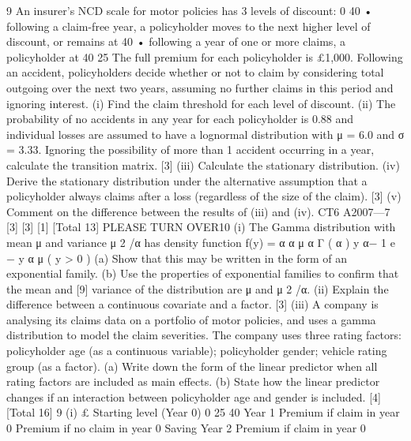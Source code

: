 \documentclass[a4paper,12pt]{article}
\begin{document}
\begin{enumerate}

9
An insurer’s NCD scale for motor policies has 3 levels of discount: 0%
40%
• following a claim-free year, a policyholder moves to the next higher level of
discount, or remains at 40%
• following a year of one or more claims, a policyholder at 40%
25%
The full premium for each policyholder is £1,000. Following an accident,
policyholders decide whether or not to claim by considering total outgoing over the
next two years, assuming no further claims in this period and ignoring interest.
(i) Find the claim threshold for each level of discount.
(ii) The probability of no accidents in any year for each policyholder is 0.88 and
individual losses are assumed to have a lognormal distribution with μ = 6.0
and σ = 3.33. Ignoring the possibility of more than 1 accident occurring in a
year, calculate the transition matrix.
[3]
(iii) Calculate the stationary distribution.
(iv) Derive the stationary distribution under the alternative assumption that a
policyholder always claims after a loss (regardless of the size of the claim). [3]
(v) Comment on the difference between the results of (iii) and (iv).
CT6 A2007—7
[3]
[3]
[1]
[Total 13]
PLEASE TURN OVER10
(i)
The Gamma distribution with mean μ and variance μ 2 /α has density function
f(y) =
α α
μ α Γ ( α )
y
α− 1
e
−
y α
μ
( y > 0 )
(a) Show that this may be written in the form of an exponential family.
(b) Use the properties of exponential families to confirm that the mean and
[9]
variance of the distribution are μ and μ 2 /α.
(ii) Explain the difference between a continuous covariate and a factor.
[3]
(iii) A company is analysing its claims data on a portfolio of motor policies, and
uses a gamma distribution to model the claim severities. The company uses
three rating factors:
policyholder age (as a continuous variable);
policyholder gender;
vehicle rating group (as a factor).
(a) Write down the form of the linear predictor when all rating factors are
included as main effects.
(b) State how the linear predictor changes if an interaction between
policyholder age and gender is included.
[4]
[Total 16]
9
(i)
£
Starting level (Year 0)
0%
25%
40%
Year 1 Premium if claim in year 0
Premium if no claim in year 0
Saving
Year 2 Premium if claim in year 0

\end{enumerate}
\end{document}
